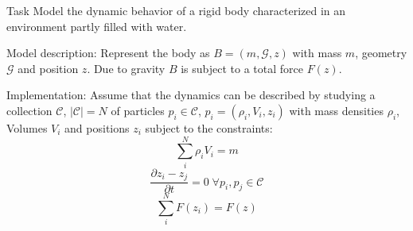 Task
Model the dynamic behavior of a rigid body characterized in an environment partly filled with water.

Model description:
Represent the body as $B = \left(m, \mathcal{G}, z\right)$ with mass $m$, geometry $\mathcal{G}$ and position $z$. 
Due to gravity $B$ is subject to a total force $F(z)$.  

Implementation:
Assume that the dynamics can be described by studying a collection $\mathcal{C}$, $|\mathcal{C}| = N$ of particles $p_i \in \mathcal{C}$, $p_i = \left(\rho_i, V_i, z_i\right)$ with mass densities $\rho_i$, Volumes $V_i$ and positions $z_i$ subject to the constraints:
$$\sum\limits_i^N \rho_i V_i = m$$
$$\frac{\partial z_i - z_j}{\partial t} = 0 \; \forall p_i, p_j \in \mathcal{C}$$
$$\sum\limits_i^N F(z_i) = F(z)$$

